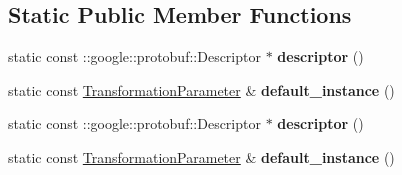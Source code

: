 \subsection*{Static Public Member Functions}
\begin{DoxyCompactItemize}
\item 
\mbox{\label{classcaffe_1_1_transformation_parameter_a6bba39479b93fb3444bebfe44bc02b6c}} 
static const \+::google\+::protobuf\+::\+Descriptor $\ast$ {\bfseries descriptor} ()
\item 
\mbox{\label{classcaffe_1_1_transformation_parameter_a6874a3f586d09565f2232df69db8d20e}} 
static const \mbox{\hyperlink{classcaffe_1_1_transformation_parameter}{Transformation\+Parameter}} \& {\bfseries default\+\_\+instance} ()
\item 
\mbox{\label{classcaffe_1_1_transformation_parameter_a73445ba99445629737fa88e3681d00a3}} 
static const \+::google\+::protobuf\+::\+Descriptor $\ast$ {\bfseries descriptor} ()
\item 
\mbox{\label{classcaffe_1_1_transformation_parameter_a985e1636f737fc6ba0ac825141a248b6}} 
static const \mbox{\hyperlink{classcaffe_1_1_transformation_parameter}{Transformation\+Parameter}} \& {\bfseries default\+\_\+instance} ()
\end{DoxyCompactItemize}
